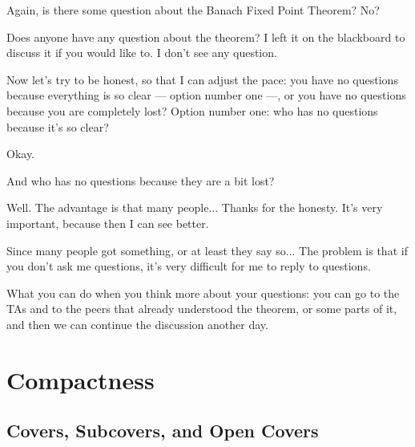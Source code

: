 \begin{speech}[00:44:33 - 00:46:20]
Again, is there some question about the Banach Fixed Point Theorem? No?

Does anyone have any question about the theorem? I left it on the blackboard to discuss it if you would like to. I don't see any question.

Now let's try to be honest, so that I can adjust the pace: you have no questions because everything is so clear --- option number one ---, or you have no questions because you are completely lost? Option number one: who has no questions because it's so clear? 

Okay.

And who has no questions because they are a bit lost? 

Well. The advantage is that many people... Thanks for the honesty. It's very important, because then I can see better.

Since many people got something, or at least they say so... The problem is that if you don't ask me questions, it's very difficult for me to reply to questions. 

What you can do when you think more about your questions: you can go to the TAs and to the peers that already understood the theorem, or some parts of it, and then we can continue the discussion another day.
\end{speech}

\begin{hidden}
\end{hidden}

\section{Compactness}

\subsection{Covers, Subcovers, and Open Covers}

